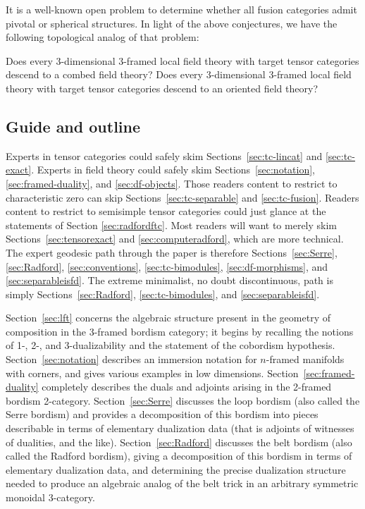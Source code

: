 \documentclass{amsart}
\begin{document}
It is a well-known open problem to determine whether all fusion categories admit pivotal or spherical structures.  In light of the above conjectures, we have the following topological analog of that problem:
\begin{mainquestion}
Does every 3-dimensional 3-framed local field theory with target tensor categories descend to a combed field theory?  Does every 3-dimensional 3-framed local field theory with target tensor categories descend to an oriented field theory?
\end{mainquestion}

\subsection{Guide and outline}

Experts in tensor categories could safely skim Sections~\ref{sec:tc-lincat} and \ref{sec:tc-exact}.  Experts in field theory could safely skim Sections~\ref{sec:notation}, \ref{sec:framed-duality}, and \ref{sec:df-objects}.  Those readers content to restrict to characteristic zero can skip Sections~\ref{sec:tc-separable} and \ref{sec:tc-fusion}.  Readers content to restrict to semisimple tensor categories could just glance at the statements of Section \ref{sec:radfordftc}.  Most readers will want to merely skim Sections~\ref{sec:tensorexact} and \ref{sec:computeradford}, which are more technical.  The expert geodesic path through the paper is therefore Sections~\ref{sec:Serre}, \ref{sec:Radford}, \ref{sec:conventions}, \ref{sec:tc-bimodules}, \ref{sec:df-morphisms}, and \ref{sec:separableisfd}.  The extreme minimalist, no doubt discontinuous, path is simply Sections~\ref{sec:Radford}, \ref{sec:tc-bimodules}, and \ref{sec:separableisfd}.

Section~\ref{sec:lft} concerns the algebraic structure present in the geometry of composition in the 3-framed bordism category; it begins by recalling the notions of 1-, 2-, and 3-dualizability and the statement of the cobordism hypothesis.  Section~\ref{sec:notation} describes an immersion notation for $n$-framed manifolds with corners, and gives various examples in low dimensions.  Section~\ref{sec:framed-duality} completely describes the duals and adjoints arising in the 2-framed bordism 2-category.  Section~\ref{sec:Serre} discusses the loop bordism (also called the Serre bordism) and provides a decomposition of this bordism into pieces describable in terms of elementary dualization data (that is adjoints of witnesses of dualities, and the like).  Section~\ref{sec:Radford} discusses the belt bordism (also called the Radford bordism), giving a decomposition of this bordism in terms of elementary dualization data, and determining the precise dualization structure needed to produce an algebraic analog of the belt trick in an arbitrary symmetric monoidal 3-category.
\end{document}
